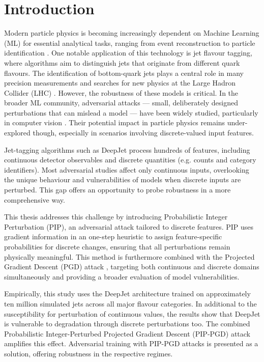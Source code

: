 \chapter{Introduction}

Modern particle physics is becoming increasingly dependent on Machine Learning (ML) for essential analytical tasks, ranging from event reconstruction to particle identification \cite{Stein2022}. One notable
application of this technology is jet flavour tagging, where algorithms aim to distinguish jets that originate
from different quark flavours. The identification of bottom-quark jets plays a central role in many precision measurements and searches for new physics at the Large Hadron Collider (LHC) \cite{PhysRevLett.121.121801}. However, the robustness of these models is critical. In the broader ML community, adversarial attacks — small, deliberately designed perturbations that can mislead a model — have been widely studied, particularly in computer vision \cite{goodfellow2015explainingharnessingadversarialexamples}. Their potential impact in particle physics remains under-explored though, especially in scenarios involving discrete-valued input features.

Jet-tagging algorithms such as DeepJet \cite{Bols_2020} process hundreds of features, including continuous detector observables and discrete quantities (e.g. counts and category identifiers). Most adversarial studies affect only continuous inputs, overlooking the unique behaviour and vulnerabilities of models when discrete inputs are perturbed. This gap offers an opportunity to probe robustness in a more comprehensive way.

This thesis addresses this challenge by introducing Probabilistic Integer Perturbation (PIP), an adversarial attack tailored to discrete features. PIP uses gradient information in an one-step heuristic to assign feature-specific probabilities for discrete changes, ensuring that all perturbations remain physically meaningful. This method is furthermore combined with the Projected Gradient Descent (PGD) attack \cite{madry2019deeplearningmodelsresistant}, targeting both continuous and discrete domains simultaneously and providing a broader evaluation of model vulnerabilities.

Empirically, this study uses the DeepJet architecture \cite{Bols_2020} trained on approximately ten million simulated jets across all major flavour categories. In additional to the susceptibility for perturbation of continuous values, the results show that DeepJet is vulnerable to degradation through discrete perturbations too. The combined Probabilistic Integer-Perturbed Projected Gradient Descent (PIP-PGD) attack amplifies this effect. Adversarial training with PIP-PGD attacks is presented as a solution, offering robustness in the respective regimes.

